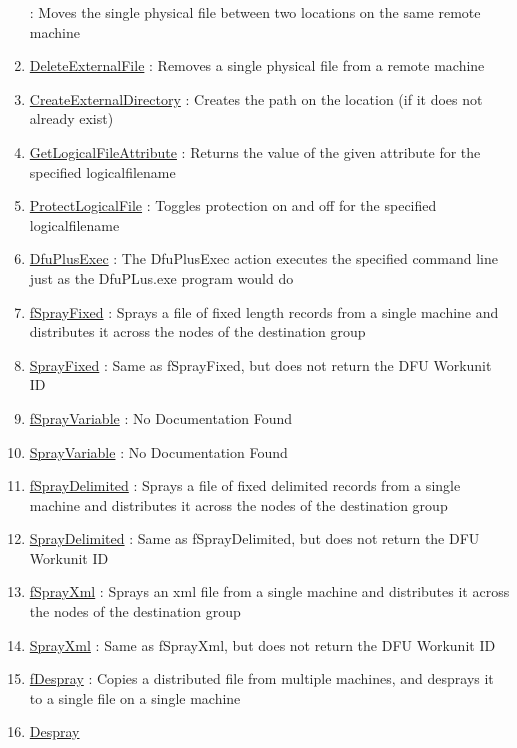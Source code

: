\begin{enumerate}
: Moves the single physical file between two locations on the same remote machine
\item \hyperlink{ecldoc:file.deleteexternalfile}{DeleteExternalFile}
: Removes a single physical file from a remote machine
\item \hyperlink{ecldoc:file.createexternaldirectory}{CreateExternalDirectory}
: Creates the path on the location (if it does not already exist)
\item \hyperlink{ecldoc:file.getlogicalfileattribute}{GetLogicalFileAttribute}
: Returns the value of the given attribute for the specified logicalfilename
\item \hyperlink{ecldoc:file.protectlogicalfile}{ProtectLogicalFile}
: Toggles protection on and off for the specified logicalfilename
\item \hyperlink{ecldoc:file.dfuplusexec}{DfuPlusExec}
: The DfuPlusExec action executes the specified command line just as the DfuPLus.exe program would do
\item \hyperlink{ecldoc:file.fsprayfixed}{fSprayFixed}
: Sprays a file of fixed length records from a single machine and distributes it across the nodes of the destination group
\item \hyperlink{ecldoc:file.sprayfixed}{SprayFixed}
: Same as fSprayFixed, but does not return the DFU Workunit ID
\item \hyperlink{ecldoc:file.fsprayvariable}{fSprayVariable}
: No Documentation Found
\item \hyperlink{ecldoc:file.sprayvariable}{SprayVariable}
: No Documentation Found
\item \hyperlink{ecldoc:file.fspraydelimited}{fSprayDelimited}
: Sprays a file of fixed delimited records from a single machine and distributes it across the nodes of the destination group
\item \hyperlink{ecldoc:file.spraydelimited}{SprayDelimited}
: Same as fSprayDelimited, but does not return the DFU Workunit ID
\item \hyperlink{ecldoc:file.fsprayxml}{fSprayXml}
: Sprays an xml file from a single machine and distributes it across the nodes of the destination group
\item \hyperlink{ecldoc:file.sprayxml}{SprayXml}
: Same as fSprayXml, but does not return the DFU Workunit ID
\item \hyperlink{ecldoc:file.fdespray}{fDespray}
: Copies a distributed file from multiple machines, and desprays it to a single file on a single machine
\item \hyperlink{ecldoc:file.despray}{Despray}

\end{enumerate}
